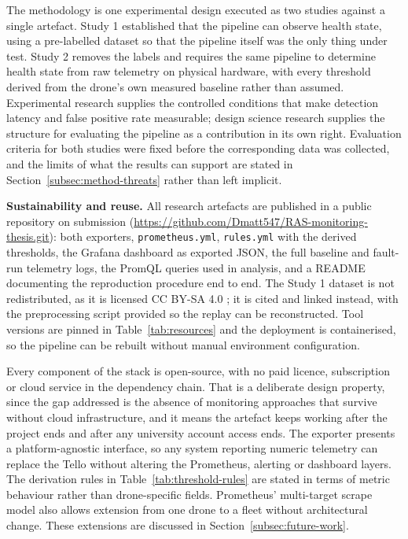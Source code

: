 The methodology is one experimental design executed as two studies against a
single artefact. Study 1 established that the pipeline can observe health state,
using a pre-labelled dataset so that the pipeline itself was the only thing under
test. Study 2 removes the labels and requires the same pipeline to determine
health state from raw telemetry on physical hardware, with every threshold
derived from the drone's own measured baseline rather than assumed. Experimental
research supplies the controlled conditions that make detection latency and false
positive rate measurable; design science research supplies the structure for
evaluating the pipeline as a contribution in its own right. Evaluation criteria
for both studies were fixed before the corresponding data was collected, and the
limits of what the results can support are stated in
Section~\ref{subsec:method-threats} rather than left implicit.

\noindent\textbf{Sustainability and reuse.} All research artefacts are published
in a public repository on submission
(\url{https://github.com/Dmatt547/RAS-monitoring-thesis.git}): both exporters,
\texttt{prometheus.yml}, \texttt{rules.yml} with the derived thresholds, the
Grafana dashboard as exported JSON, the full baseline and fault-run telemetry
logs, the PromQL queries used in analysis, and a README documenting the
reproduction procedure end to end. The Study 1 dataset is not redistributed, as
it is licensed CC BY-SA 4.0 \citep{ekanayakadevlk2024}; it is cited and linked
instead, with the preprocessing script provided so the replay can be
reconstructed. Tool versions are pinned in Table~\ref{tab:resources} and the
deployment is containerised, so the pipeline can be rebuilt without manual
environment configuration.

Every component of the stack is open-source, with no paid licence, subscription
or cloud service in the dependency chain. That is a deliberate design property,
since the gap addressed is the absence of monitoring approaches that survive
without cloud infrastructure, and it means the artefact keeps working after the
project ends and after any university account access ends. The exporter
presents a platform-agnostic interface, so any system reporting numeric telemetry
can replace the Tello without altering the Prometheus, alerting or dashboard
layers. The derivation rules in Table~\ref{tab:threshold-rules} are stated in
terms of metric behaviour rather than drone-specific fields. Prometheus'
multi-target scrape model also allows extension from one drone to a fleet without
architectural change. These extensions are discussed in
Section~\ref{subsec:future-work}.
